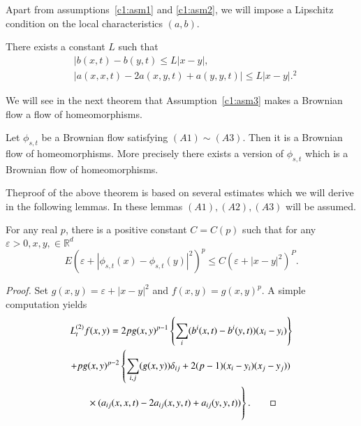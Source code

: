 Apart from assumptions~\ref{c1:asm1} and \ref{c1:asm2}, we will impose a Lipschitz
condition on the local characteristics $(a, b)$. 


\begin{Assumption}\label{c1:asm3}%
  There exists a constant $L$ such that 
  \begin{align*}
      &|b(x,t) - b(y,t) \le L|x-y| \tag{1.3.1},\label{c1:eq1.3.1}\\
      &|a(x,x,t)-2a(x,y,t) + a(y,y,t)|\le L|x-y|.^2 \tag{1.3.2}\label{c1:eq1.3.2}
    \end{align*}
\end{Assumption}

We will see in the next theorem that Assumption~\ref{c1:asm3} makes a Brownian
flow a flow of homeomorphisms. 

\setcounter{theorem}{1}
\begin{theorem}\label{c1:thm1.3.2}%
  Let $\phi_{s,t}$ be a Brownian flow satisfying $(A1) \sim(A3)$. Then
  it is a Brownian flow of homeomorphisms. More precisely there exists a
  version of $\phi_{s,t}$ which is a Brownian flow of homeomorphisms. 
\end{theorem}

The\pageoriginale proof of the above theorem is based on several estimates which we
will derive in the following lemmas. In these lemmas $(A1), (A2),
(A3)$ will be assumed. 


\setcounter{Lemma}{2}
\begin{Lemma}\label{c1:lem1.3.3}%
  For  any real $p$, there is a positive constant $C=C(p)$ such that
  for any $\varepsilon >0,x,y,\in \mathbb{R}^d$ 
  \begin{equation*} 
    E(\varepsilon+|\phi_{s,t} (x) - \phi_{s,t} (y)|^2)^p \le C
    (\varepsilon + |x-y|^2)^P. \tag{1.3.3}\label{c1:eq1.3.3} 
\end{equation*}
\end{Lemma}

\noindent \textit{Proof.}
Set $g(x,y) = \varepsilon +|x-y|^2$ and $f(x,y) =
g(x,y)^p$. A simple computation yields 
\begin{multline*}
  L^{(2)}_t f(x,y) = 2pg(x,y)^{p-1} \left\{\sum_i (b^i (x,t) -b^i(y, t))
  (x_i - y_i) \right\}\\  
  + pg(x,y)^{p-2} \left\{ \sum_{i,j} (g(x,y)) \delta_{ij} + 2(p-1)
  (x_i-y_i) (x_j-y_j))\right.\\ 
  \left.\vphantom{\sum_{i,j}} \times (a_{ij} (x,x,t) - 2a_{ij} (x,y,t) + a_{ij}
  (y,y,t))\right\}.\tag*{$\Box$} 
\end{multline*}

